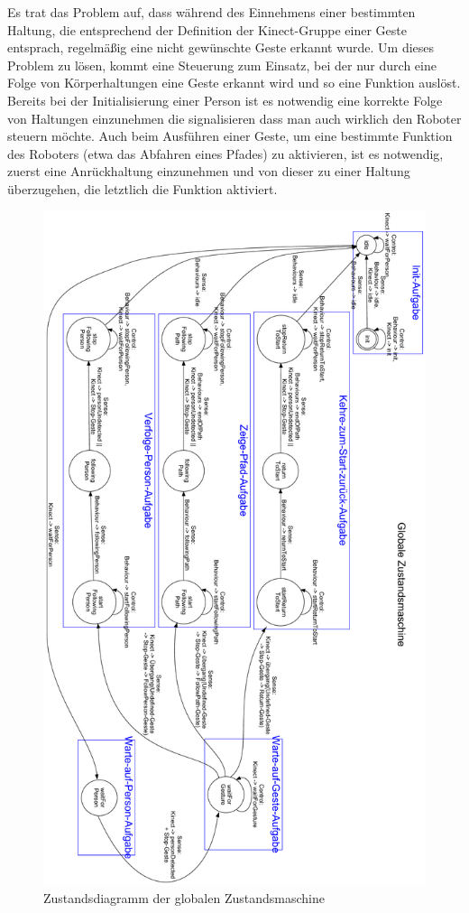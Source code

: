Es trat das Problem auf, dass während des Einnehmens einer bestimmten Haltung, die entsprechend der Definition der Kinect-Gruppe einer Geste entsprach, regelmäßig eine nicht gewünschte Geste erkannt wurde.
Um dieses Problem zu lösen, kommt eine Steuerung zum Einsatz, bei der nur durch eine Folge von Körperhaltungen eine Geste erkannt wird und so eine Funktion auslöst.
Bereits bei der Initialisierung einer Person ist es notwendig eine korrekte Folge von Haltungen einzunehmen die signalisieren dass man auch wirklich den Roboter steuern möchte.
Auch beim Ausführen einer Geste, um eine bestimmte Funktion des Roboters (etwa das Abfahren eines Pfades) zu aktivieren, ist es notwendig, zuerst eine Anrückhaltung einzunehmen und von dieser zu einer Haltung überzugehen, die letztlich die Funktion aktiviert.

\begin{landscape}
\begin{figure}
	\includegraphics[scale=0.43,angle=90]{graphics/SCHEMA-GlobalStateMachine-hk.pdf}
	\caption{Zustandsdiagramm der globalen Zustandsmaschine}
	\label{fig:integration_statemachine}
\end{figure}
\end{landscape}

